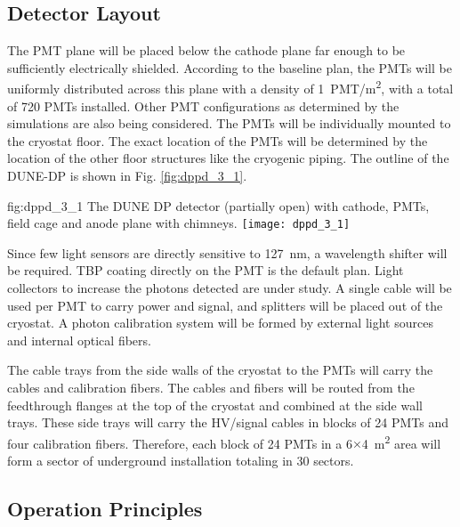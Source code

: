 \subsection{Detector Layout}
\label{sec:fddp-pd-1.4}

The PMT plane will be placed below the cathode plane far enough to be sufficiently electrically shielded. According to the baseline plan, the PMTs will be uniformly distributed across this plane with a density of \SI{1}{PMT/m^2}, with a total of \num{720} PMTs installed. Other PMT configurations as determined by the simulations are also being considered. The PMTs will be individually mounted to the cryostat floor. The exact location of the PMTs will be determined by the location of the other floor structures like the cryogenic piping. The outline of the DUNE-DP is shown in Fig. \ref{fig:dppd_3_1}.

\begin{dunefigure}{fig:dppd_3_1}
{The DUNE DP detector (partially open) with cathode, PMTs, field cage and anode plane with chimneys.}
\texttt{[image: dppd\_3\_1]}
\end{dunefigure}

Since few light sensors are directly sensitive to \SI{127}{nm}, a wavelength shifter will be required. TBP coating directly on the PMT is the default plan. Light collectors to increase the photons detected are under study. A single cable will be used per PMT to carry power and signal, and splitters will be placed out of the cryostat. A photon calibration system will be formed by external light sources and internal optical fibers.  

The cable trays from the side walls of the cryostat to the PMTs will carry the cables and calibration fibers. The cables and fibers will be routed from the feedthrough flanges at the top of the cryostat and  combined at the side wall trays. These side trays will carry the HV/signal cables in blocks of \num{24} PMTs and four calibration fibers. Therefore, each block of \num{24} PMTs in a \num{6}$\times$\SI{4}{m^2} area will form a sector of underground installation totaling in \num{30} sectors.

\subsection{Operation Principles}
\label{sec:fddp-pd-1.5}

